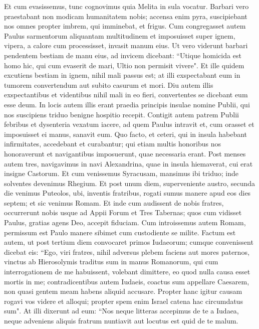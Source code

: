 \begin{biblechapter}  
\verse Et cum evasissemus, tunc cognovimus quia Melita in sula vocatur. 
\verse Barbari vero praestabant non modicam humanitatem nobis; accensa enim pyra, suscipiebant nos omnes propter imbrem, qui imminebat, et frigus. 
\verse Cum congregasset autem Paulus sarmentorum aliquantam multitudinem et imposuisset super ignem, vipera, a calore cum processisset, invasit manum eius. 
\verse Ut vero viderunt barbari pendentem bestiam de manu eius, ad invicem dicebant: “Utique homicida est homo hic, qui cum evaserit de mari, Ultio non permisit vivere". 
\verse Et ille quidem excutiens bestiam in ignem, nihil mali passus est; 
\verse at illi exspectabant eum in tumorem convertendum aut subito casurum et mori. Diu autem illis exspectantibus et videntibus nihil mali in eo fieri, convertentes se dicebant eum esse deum. 
\verse In locis autem illis erant praedia principis insulae nomine Publii, qui nos suscipiens triduo benigne hospitio recepit. 
\verse Contigit autem patrem Publii febribus et dysenteria vexatum iacere, ad quem Paulus intravit et, cum orasset et imposuisset ei manus, sanavit eum. 
\verse Quo facto, et ceteri, qui in insula habebant infirmitates, accedebant et curabantur; 
\verse qui etiam multis honoribus nos honoraverunt et navigantibus imposuerunt, quae necessaria erant. 
\verse Post menses autem tres, navigavimus in navi Alexandrina, quae in insula hiemaverat, cui erat insigne Castorum. 
\verse Et cum venissemus Syracusam, mansimus ibi triduo; 
\verse inde solventes devenimus Rhegium. Et post unum diem, superveniente austro, secunda die venimus Puteolos, 
\verse ubi, inventis fratribus, rogati sumus manere apud eos dies septem; et sic venimus Romam.  
\verse Et inde cum audissent de nobis fratres, occurrerunt nobis usque ad Appii Forum et Tres Tabernas; quos cum vidisset Paulus, gratias agens Deo, accepit fiduciam. 
\verse Cum introissemus autem Romam, permissum est Paulo manere sibimet cum custodiente se milite. 
\verse Factum est autem, ut post tertium diem convocaret primos Iudaeorum; cumque convenissent dicebat eis: “Ego, viri fratres, nihil adversus plebem faciens aut mores paternos, vinctus ab Hierosolymis traditus sum in manus Romanorum, 
\verse qui cum interrogationem de me habuissent, volebant dimittere, eo quod nulla causa esset mortis in me; 
\verse contradicentibus autem Iudaeis, coactus sum appellare Caesarem, non quasi gentem meam habens aliquid accusare. 
\verse Propter hanc igitur causam rogavi vos videre et alloqui; propter spem enim Israel catena hac circumdatus sum". 
\verse At illi dixerunt ad eum: “Nos neque litteras accepimus de te a Iudaea, neque adveniens aliquis fratrum nuntiavit aut locutus est quid de te malum. 

\end{biblechapter}
